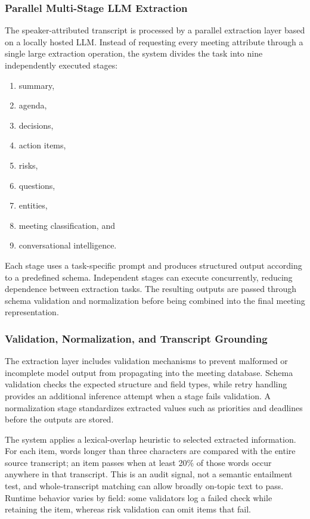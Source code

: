\documentclass[conference]{IEEEtran}
\begin{document}
\subsubsection{Parallel Multi-Stage LLM Extraction}
The speaker-attributed transcript is processed by a parallel extraction layer based on a locally hosted LLM. Instead of requesting every meeting attribute through a single large extraction operation, the system divides the task into nine independently executed stages:
\begin{enumerate}
    \item summary, 
    \item agenda, 
    \item decisions, 
    \item action items, 
    \item risks, 
    \item questions, 
    \item entities, 
    \item meeting classification, and 
    \item conversational intelligence. 
\end{enumerate}
Each stage uses a task-specific prompt and produces structured output according to a predefined schema. Independent stages can execute concurrently, reducing dependence between extraction tasks. The resulting outputs are passed through schema validation and normalization before being combined into the final meeting representation.

\subsubsection{Validation, Normalization, and Transcript Grounding}
The extraction layer includes validation mechanisms to prevent malformed or incomplete model output from propagating into the meeting database. Schema validation checks the expected structure and field types, while retry handling provides an additional inference attempt when a stage fails validation. A normalization stage standardizes extracted values such as priorities and deadlines before the outputs are stored.

The system applies a lexical-overlap heuristic to selected extracted information. For each item, words longer than three characters are compared with the entire source transcript; an item passes when at least 20\% of those words occur anywhere in that transcript. This is an audit signal, not a semantic entailment test, and whole-transcript matching can allow broadly on-topic text to pass. Runtime behavior varies by field: some validators log a failed check while retaining the item, whereas risk validation can omit items that fail.
\end{document}
